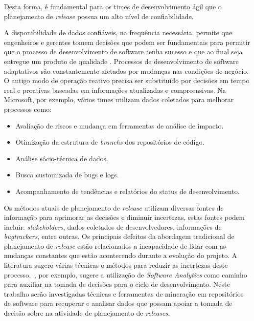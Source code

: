 Desta forma, é fundamental para os times de desenvolvimento ágil que o planejamento de \textit{release} possua um alto nível de confiabilidade\cite{McDaid}.

A disponibilidade de dados confiáveis, na frequência necessária, permite que engenheiros e gerentes tomem decisões que podem ser fundamentais para permitir que o processo de desenvolvimento de software tenha sucesso e que ao final seja entregue um produto de qualidade \cite{codemine}. Processos de desenvolvimento de software adaptativos são constantemente afetados por mudanças nas condições de negócio. O antigo modo de operação reativo precisa ser substituído por decisões em tempo real e proativas baseadas em informações atualizadas e compreensivas\cite{artAndScience}. Na Microsoft, por exemplo, vários times utilizam dados coletados para melhorar processos como:

\begin{itemize}
    \item Avaliação de riscos e mudança em ferramentas de análise de impacto.
    \item Otimização da estrutura de \textit{branchs} dos repositórios de código.
    \item Análise sócio-técnica de dados.
    \item Busca customizada de bugs e logs.
    \item Acompanhamento de tendências e relatórios do status de desenvolvimento.
\end{itemize}

    Os métodos atuais de planejamento de \textit{release} utilizam diversas fontes de informação para aprimorar as decisões e diminuir incertezas, estas fontes podem incluir: \textit{stakeholders}, dados coletados de desenvolvedores, informações de \textit{bugtrackers}, entre outras. Os principais defeitos da abordagem tradicional de planejamento de \textit{release} estão relacionados a incapacidade de lidar com as mudanças constantes que estão acontecendo durante a evolução do projeto. A literatura sugere várias técnicas e métodos para reduzir as incertezas deste processo,~\cite{artAndScience}, por exemplo, sugere a utilização de \textit{Software Analytics} como caminho para auxiliar na tomada de decisões para o ciclo de desenvolvimento.
Neste trabalho serão investigadas técnicas e ferramentas de mineração em repositórios de software para recuperar e analisar dados que possam apoiar a tomada de decisão sobre na atividade de planejamento de \textit{releases}.

